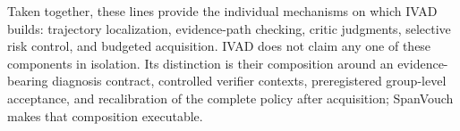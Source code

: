 Taken together, these lines provide the individual mechanisms on which IVAD
builds: trajectory localization, evidence-path checking, critic judgments,
selective risk control, and budgeted acquisition. IVAD does not claim any one
of these components in isolation. Its distinction is their composition around
an evidence-bearing diagnosis contract, controlled verifier contexts,
preregistered group-level acceptance, and recalibration of the complete policy
after acquisition; SpanVouch makes that composition executable.
